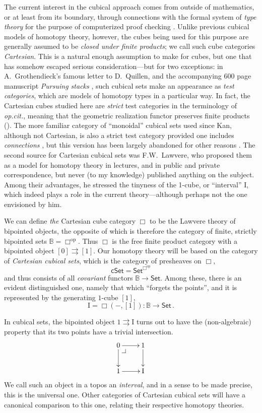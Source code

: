 \documentclass[11pt]{amsart}
\makeatletter
\newcommand{\opcit}{\emph{op.cit.}}
\newcommand{\B}{\ensuremath{\mathbb{B}}}
\newcommand{\psh}[1]{\ensuremath{\mathsf{Set}^{#1^{\mathrm{op}}}}}
\newcommand{\Set}{\ensuremath{\mathsf{Set}}}
\newcommand{\cSet}{\ensuremath{\mathsf{cSet}}}
\newcommand{\op}[1]{\ensuremath{{#1}^{\mathrm{op}}}}
\renewcommand{\to}{\ensuremath{\rightarrow}}
\newcommand{\too}{\ensuremath{\longrightarrow}}
\newcommand{\I}{\ensuremath{\mathrm{I}}}
\theoremstyle{remark}
\theoremstyle{definition}
\newcommand{\pbcorner}[1][dr]{\save*!/#1-1.2pc/#1:(-1,1)@^{|-}\restore}
\makeatother
\begin{document}
The current interest in the cubical approach comes from outside of mathematics, or at least from its boundary, through connections with the  formal system of \emph{type theory} for the purpose of computerized proof checking \cite{AC:IASlarge-scale}.  Unlike previous cubical models of homotopy theory, however, the cubes being used for this purpose are generally assumed to be \emph{closed under finite products}; we call such cube categories \emph{Cartesian}.  This is a natural enough assumption to make for cubes, but one that has somehow escaped serious consideration---but for two exceptions: in A.~Grothendieck's famous letter to D.~Quillen, and the accompanying 600 page manuscript \emph{Pursuing stacks} \cite{}, such cubical sets make an appearance as \emph{test categories}, which are models of homotopy types in a particular way.  In fact, the Cartesian cubes studied here are \emph{strict} test categories in the terminology of \opcit, meaning that the geometric realization functor preserves finite products (\cite{BM:varieties}).  The more familiar category of ``monoidal'' cubical sets used since Kan, although not Cartesian, is also a strict test category provided one includes \emph{connections} \cite{malt}, but this version has been largely abandoned for other reasons \cite{Brown}.  The second source for Cartesian cubical sets was F.W.~Lawvere, who proposed them as a model for homotopy theory in lectures, and in public and private correspondence, but never (to my knowledge) published anything on the subject.   Among their advantages, he stressed the tinyness of the 1-cube, or ``interval'' $\I$, which indeed plays a role in the current theory---although perhaps not the one envisioned by him.

We can define \emph{the} Cartesian cube category $\Box$ to be the Lawvere theory of bipointed objects, the opposite of which is therefore the category of finite, strictly bipointed sets $\B = \op\Box$.  Thus $\Box$ is the free finite product category with a bipointed object $[0]\rightrightarrows [1]$.  Our homotopy theory will be based on the category of \emph{Cartesian cubical sets}, which is the category of presheaves on $\Box$,
\[
\cSet = \psh{\Box}
\]
and thus consists of all \emph{covariant} functors $\B\to\Set$. Among these, there is an evident distinguished one, namely that which ``forgets the points'', and it is represented by the generating $1$-cube $[1]$,
\[
\I = \Box(-,[1]) : \B \too\Set\,.
\]

In cubical sets, the bipointed object $1\rightrightarrows\I$ turns out to have the (non-algebraic) property that its two points have a trivial intersection.  
\[
\xymatrix{
0 \ar[d] \ar[r] \pbcorner & 1 \ar[d]  \\
1 \ar[r] & \I
}
\]
We call such an object in a topos an \emph{interval}, and in a sense to be made precise, this is the universal one.  Other categories of Cartesian cubical sets will have a canonical comparison to this one, relating their respective homotopy theories.
\end{document}
